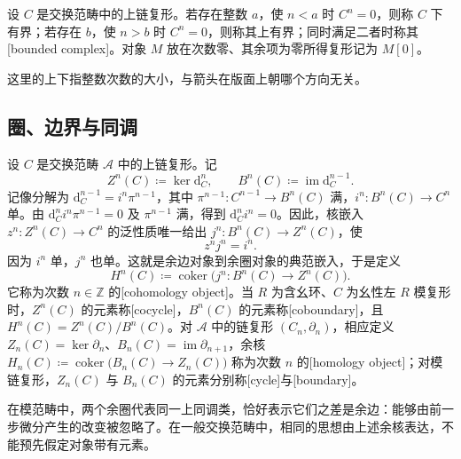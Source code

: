 \begin{definition}\label{b4:def:bounded-complex}
	设 \(C\) 是交换范畴中的上链复形。若存在整数 \(a\)，使 \(n<a\) 时 \(C^n=0\)，则称 \(C\) 下有界；若存在 \(b\)，使 \(n>b\) 时 \(C^n=0\)，则称其上有界；同时满足二者时称其[bounded complex]。对象 \(M\) 放在次数零、其余项为零所得复形记为 \(M[0]\)。
\end{definition}

这里的上下指整数次数的大小，与箭头在版面上朝哪个方向无关。

\subsection{圈、边界与同调}
\label{b4:subsec:0501:02}

\begin{definition}\label{b4:def:cohomology}
	设 \(C\) 是交换范畴 \(\mathcal A\) 中的上链复形。记
	\[
		Z^n(C)\coloneqq\ker \mathrm{d}_C^n,\qquad B^n(C)\coloneqq\operatorname{im}\mathrm{d}_C^{n-1}.
	\]
	记像分解为 \(\mathrm{d}_C^{n-1}=i^n\pi^{n-1}\)，其中 \(\pi^{n-1}:C^{n-1}\to B^n(C)\) 满，\(i^n:B^n(C)\to C^n\) 单。由 \(\mathrm{d}_C^ni^n\pi^{n-1}=0\) 及 \(\pi^{n-1}\) 满，得到 \(\mathrm{d}_C^ni^n=0\)。因此，核嵌入 \(z^n:Z^n(C)\to C^n\) 的泛性质唯一给出 \(j^n:B^n(C)\to Z^n(C)\)，使
	\[
		z^nj^n=i^n.
	\]
	因为 \(i^n\) 单，\(j^n\) 也单。这就是余边对象到余圈对象的典范嵌入，于是定义
	\[
		H^n(C)\coloneqq\operatorname{coker}\bigl(j^n:B^n(C)\longrightarrow Z^n(C)\bigr).
	\]
	它称为次数 \(n\in\mathbb Z\) 的[cohomology object]。当 \(R\) 为含幺环、\(C\) 为幺性左 \(R\) 模复形时，\(Z^n(C)\) 的元素称[cocycle]，\(B^n(C)\) 的元素称[coboundary]，且 \(H^n(C)=Z^n(C)/B^n(C)\)。对 \(\mathcal A\) 中的链复形 \((C_n,\partial_n)\)，相应定义 \(Z_n(C)=\ker\partial_n\)、\(B_n(C)=\operatorname{im}\partial_{n+1}\)，余核 \(H_n(C)\coloneqq\operatorname{coker}\bigl(B_n(C)\longrightarrow Z_n(C)\bigr)\) 称为次数 \(n\) 的[homology object]；对模链复形，\(Z_n(C)\) 与 \(B_n(C)\) 的元素分别称[cycle]与[boundary]。
\end{definition}

在模范畴中，两个余圈代表同一上同调类，恰好表示它们之差是余边：能够由前一步微分产生的改变被忽略了。在一般交换范畴中，相同的思想由上述余核表达，不能预先假定对象带有元素。

